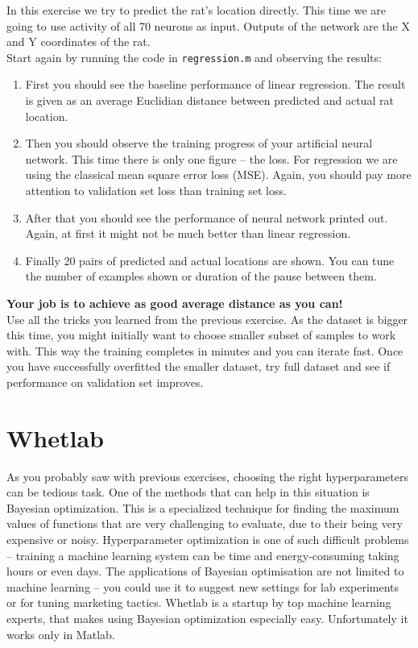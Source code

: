 \documentclass[a4paper,11pt]{article}
\begin{document}
In this exercise we try to predict the rat's location directly. This time we are going to use activity of all 70 neurons as input. Outputs of the network are the X and Y coordinates of the rat.\\

Start again by running the code in \texttt{regression.m} and observing the results:

\begin{enumerate}
	\item First you should see the baseline performance of linear regression. The result is given as an average Euclidian distance between predicted and actual rat location.
	\item Then you should observe the training progress of your artificial neural network. This time there is only one figure -- the loss. For regression we are using the classical mean square error loss (MSE). Again, you should pay more attention to validation set loss than training set loss.
	\item After that you should see the performance of neural network printed out. Again, at first it might not be much better than linear regression.
	\item Finally 20 pairs of predicted and actual locations are shown. You can tune the number of examples shown or duration of the pause between them.
\end{enumerate}

\textbf{Your job is to achieve as good average distance as you can!}\\

Use all the tricks you learned from the previous exercise. As the dataset is bigger this time, you might initially want to choose smaller subset of samples to work with. This way the training completes in minutes and you can iterate fast. Once you have successfully overfitted the smaller dataset, try full dataset and see if performance on validation set improves.

%
%
\section{Whetlab}

As you probably saw with previous exercises, choosing the right hyperparameters can be tedious task. One of the methods that can help in this situation is Bayesian optimization. This is a specialized technique for finding the maximum values of functions that are very challenging to evaluate, due to their being very expensive or noisy. Hyperparameter optimization is one of such difficult problems -- training a machine learning system can be time and energy-consuming taking hours or even days. The applications of Bayesian optimisation are not limited to machine learning -- you could use it to suggest new settings for lab experiments or for tuning marketing tactics. Whetlab is a startup by top machine learning experts, that makes using Bayesian optimization especially easy. Unfortunately it works only in Matlab.\\
\end{document}
